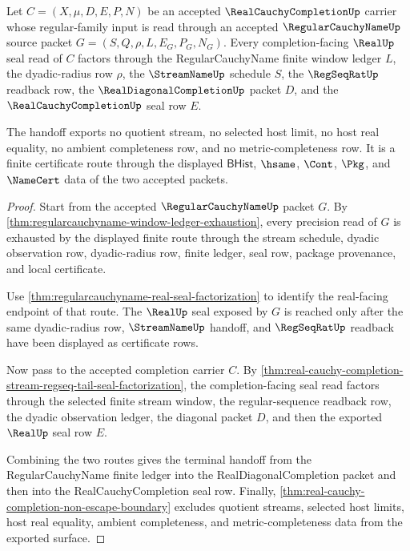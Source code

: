 \begin{theorem}
\label{thm:real-cauchy-completion-regularcauchyname-terminal-handoff}
Let $C=(X,\mu,D,E,P,N)$ be an accepted $\RealCauchyCompletionUp$ carrier whose regular-family input is read through an accepted $\RegularCauchyNameUp$ source packet $G=(S,Q,\rho,L,E_G,P_G,N_G)$. Every completion-facing $\RealUp$ seal read of $C$ factors through the RegularCauchyName finite window ledger $L$, the dyadic-radius row $\rho$, the $\StreamNameUp$ schedule $S$, the $\RegSeqRatUp$ readback row, the $\RealDiagonalCompletionUp$ packet $D$, and the $\RealCauchyCompletionUp$ seal row $E$.

The handoff exports no quotient stream, no selected host limit, no host real equality, no ambient completeness row, and no metric-completeness row. It is a finite certificate route through the displayed $\mathsf{BHist}$, $\hsame$, $\Cont$, $\Pkg$, and $\NameCert$ data of the two accepted packets.
\end{theorem}
\begin{proof}
Start from the accepted $\RegularCauchyNameUp$ packet $G$. By \autoref{thm:regularcauchyname-window-ledger-exhaustion}, every precision read of $G$ is exhausted by the displayed finite route through the stream schedule, dyadic observation row, dyadic-radius row, finite ledger, seal row, package provenance, and local certificate.

Use \autoref{thm:regularcauchyname-real-seal-factorization} to identify the real-facing endpoint of that route. The $\RealUp$ seal exposed by $G$ is reached only after the same dyadic-radius row, $\StreamNameUp$ handoff, and $\RegSeqRatUp$ readback have been displayed as certificate rows.

Now pass to the accepted completion carrier $C$. By \autoref{thm:real-cauchy-completion-stream-regseq-tail-seal-factorization}, the completion-facing seal read factors through the selected finite stream window, the regular-sequence readback row, the dyadic observation ledger, the diagonal packet $D$, and then the exported $\RealUp$ seal row $E$.

Combining the two routes gives the terminal handoff from the RegularCauchyName finite ledger into the RealDiagonalCompletion packet and then into the RealCauchyCompletion seal row. Finally, \autoref{thm:real-cauchy-completion-non-escape-boundary} excludes quotient streams, selected host limits, host real equality, ambient completeness, and metric-completeness data from the exported surface.
\end{proof}


